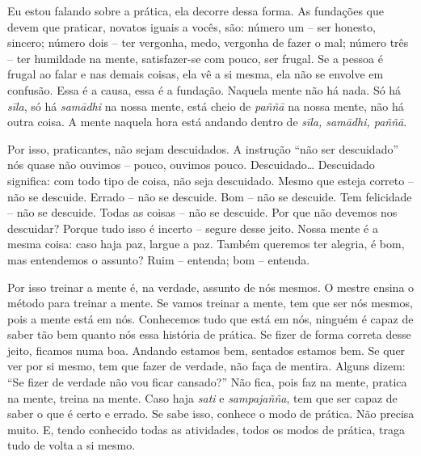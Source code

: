 Eu estou falando sobre a prática, ela decorre dessa forma. As
fundações que devem que praticar, novatos iguais a vocês, são: número
um – ser honesto, sincero; número dois – ter vergonha, medo, vergonha
de fazer o mal; número três – ter humildade na mente, satisfazer-se com
pouco, ser frugal. Se a pessoa é frugal ao falar e nas demais coisas,
ela vê a si mesma, ela não se envolve em confusão. Essa é a causa, essa
é a fundação. Naquela mente não há nada. Só há \textit{sīla}, só há
\textit{samādhi} na nossa mente, está cheio de \textit{paññā} na
nossa mente, não há outra coisa. A mente naquela hora está andando
dentro de \textit{sīla, samādhi, paññā}.

Por isso, praticantes, não sejam descuidados. A instrução “não ser
descuidado” nós quase não ouvimos – pouco, ouvimos pouco. Descuidado…
Descuidado significa: com todo tipo de coisa, não seja descuidado.
Mesmo que esteja correto – não se descuide. Errado – não se descuide.
Bom – não se descuide. Tem felicidade – não se descuide. Todas as
coisas – não se descuide. Por que não devemos nos descuidar? Porque
tudo isso é incerto – segure desse jeito. Nossa mente é a mesma coisa:
caso haja paz, largue a paz. Também queremos ter alegria, é bom, mas
entendemos o assunto? Ruim – entenda; bom – entenda. 

Por isso treinar a mente é, na verdade, assunto de nós mesmos. O
mestre ensina o método para treinar a mente. Se vamos treinar a mente,
tem que ser nós mesmos, pois a mente está em nós. Conhecemos tudo que
está em nós, ninguém é capaz de saber tão bem quanto nós essa história
de prática. Se fizer de forma correta desse jeito, ficamos numa boa.
Andando estamos bem, sentados estamos bem. Se quer ver por si mesmo,
tem que fazer de verdade, não faça de mentira. Alguns dizem: “Se fizer
de verdade não vou ficar cansado?” Não fica, pois faz na mente, pratica
na mente, treina na mente. Caso haja \textit{sati} e
\textit{sampajañña}, tem que ser capaz de saber o que é certo e errado.
Se sabe isso, conhece o modo de prática. Não precisa muito. E, tendo
conhecido todas as atividades, todos os modos de prática, traga tudo de
volta a si mesmo.

